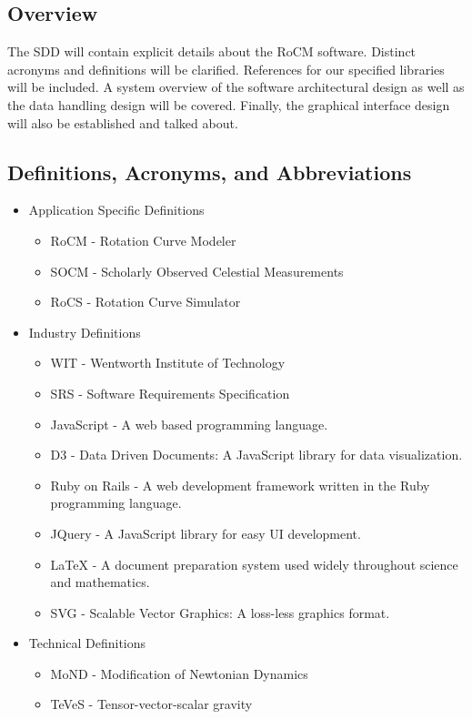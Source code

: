 \documentclass[titlepage]{article}
\begin{document}
\subsection{Overview}
The SDD will contain explicit details about the RoCM software. Distinct acronyms and definitions will be clarified. References for our specified libraries will be included. A system overview of the software architectural design as well as the data handling design will be covered. Finally, the graphical interface design will also be established and talked about. 

\subsection{Definitions, Acronyms, and Abbreviations}
\begin{itemize}
	\item Application Specific Definitions
	\begin{itemize}
		\item RoCM - Rotation Curve Modeler
		\item SOCM - Scholarly Observed Celestial Measurements
		\item RoCS - Rotation Curve Simulator
	\end{itemize}
	\item Industry Definitions
	\begin{itemize}
		\item WIT - Wentworth Institute of Technology
		\item SRS - Software Requirements Specification
		\item JavaScript - A web based programming language.
		\item D3 - Data Driven Documents: A JavaScript library for data visualization.
		\item Ruby on Rails - A web development framework written in the Ruby programming language.
		\item JQuery - A JavaScript library for easy UI development.
		\item LaTeX - A document preparation system used widely throughout science and mathematics.
		\item SVG - Scalable Vector Graphics: A loss-less graphics format.
	\end{itemize}
	\item Technical Definitions
	\begin{itemize}
        \item MoND - Modification of Newtonian Dynamics
		\item TeVeS - Tensor-vector-scalar gravity

\end{itemize}
\end{itemize}
\end{document}

